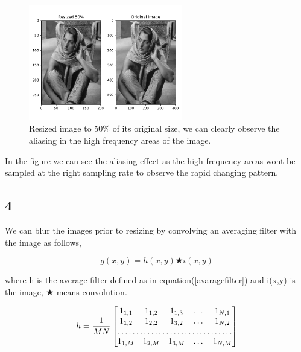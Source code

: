 {\begin{figure}[!htb]
    {\centering
        \includegraphics[width=0.60\textwidth]{resized.pdf}
        \caption{Resized image to 50\% of its original size, we can clearly observe the aliasing in the high frequency areas of the image.}
        \label{resized}
    \par}
    \end{figure}

In the figure we can see the aliasing effect as the high frequency areas wont be sampled at the right sampling rate to observe the rapid changing pattern.

\subsection{4}

We can blur the images prior to resizing by convolving an averaging filter with the image as follows,
\begin{figure}[!htb]
\begin{equation}
    g(x,y) = h(x,y) \bigstar i(x,y)
\end{equation}
\end{figure}

where h is the average filter defined as in equation(\ref{avaragefilter}) and i(x,y) is the image, $\bigstar$ means convolution. 

\begin{figure}[!htb]
\begin{equation}
    h = \frac{1}{MN}\begin{bmatrix}
        1_{1,1}       & 1_{1,2} & 1_{1,3} & \dots & 1_{N,1} \\
        1_{1,2}       & 1_{2,2} & 1_{3,2} & \dots & 1_{N,2} \\
        \hdotsfor{5} \\
        1_{1,M}       & 1_{2,M} & 1_{3,M} & \dots & 1_{N,M}
    \end{bmatrix}
    \label{avaragefilter}
\end{equation}
\end{figure}

}
